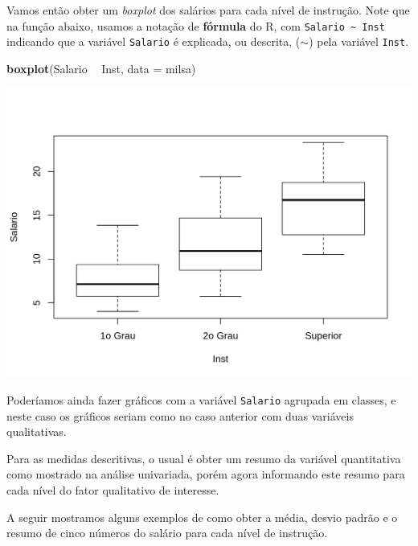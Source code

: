 \documentclass[10pt,a4paper]{book}
\newenvironment{Shaded}{\begin{snugshade}}{\end{snugshade}}
\newcommand{\KeywordTok}[1]{\textcolor[rgb]{0.13,0.29,0.53}{\textbf{#1}}}
\newcommand{\DataTypeTok}[1]{\textcolor[rgb]{0.13,0.29,0.53}{#1}}
\newcommand{\StringTok}[1]{\textcolor[rgb]{0.31,0.60,0.02}{#1}}
\newcommand{\OperatorTok}[1]{\textcolor[rgb]{0.81,0.36,0.00}{\textbf{#1}}}
\newcommand{\NormalTok}[1]{#1}
\begin{document}
Vamos então obter um \emph{boxplot} dos salários para cada nível de
instrução. Note que na função abaixo, usamos a notação de
\textbf{fórmula} do R, com \texttt{Salario\ \textasciitilde{}\ Inst}
indicando que a variável \texttt{Salario} é explicada, ou descrita,
(\(\sim\)) pela variável \texttt{Inst}.

\begin{Shaded}
\begin{Highlighting}[]
\KeywordTok{boxplot}\NormalTok{(Salario }\OperatorTok{~}\StringTok{ }\NormalTok{Inst, }\DataTypeTok{data =}\NormalTok{ milsa)}
\end{Highlighting}
\end{Shaded}

\begin{center}\includegraphics{figures/unnamed-chunk-319-1} \end{center}

Poderíamos ainda fazer gráficos com a variável \texttt{Salario} agrupada
em classes, e neste caso os gráficos seriam como no caso anterior com
duas variáveis qualitativas.

Para as medidas descritivas, o usual é obter um resumo da variável
quantitativa como mostrado na análise univariada, porém agora informando
este resumo para cada nível do fator qualitativo de interesse.

A seguir mostramos alguns exemplos de como obter a média, desvio padrão
e o resumo de cinco números do salário para cada nível de instrução.
\end{document}
